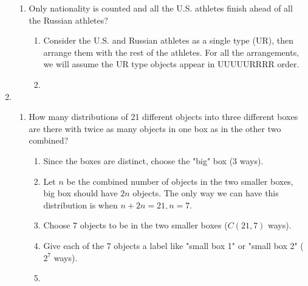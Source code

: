 \documentclass[12pt]{amsart}
\begin{document}
\begin{enumerate}
\begin{enumerate}
        \item Only nationality is counted and all the U.S. athletes finish ahead of all the
Russian athletes?
        \begin{enumerate}
            \item Consider the U.S. and Russian athletes as a single type (UR), then arrange them with the rest of the athletes. For all the arrangements, we will assume the UR type objects appear in UUUUURRRR order. 
            \item {}
        \end{enumerate}
    \end{enumerate}
\item \begin{enumerate}
    \item How many distributions of 21 different objects into three different boxes are
there with twice as many objects in one box as in the other two combined?
    \begin{enumerate}
        \item Since the boxes are distinct, choose the "big" box (3 ways).
        \item Let $n$ be the combined number of objects in the two smaller boxes, big box should have $2n$ objects. The only way we can have this distribution is when $n+2n=21,n=7$.
        \item Choose 7 objects to be in the two smaller boxes ($C(21,7)$ ways).
        \item Give each of the 7 objects a label like "small box 1" or "small box 2" ($2^7$ ways).
        \item {}
    \end{enumerate}
\end{enumerate}


\end{enumerate}
\end{document}
